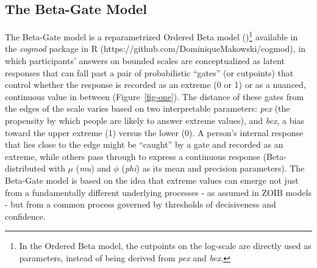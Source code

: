 \documentclass[
  jou,
  floatsintext,
  longtable,
  nolmodern,
  notxfonts,
  notimes,
  colorlinks=true,linkcolor=blue,citecolor=blue,urlcolor=blue]{apa7}
\begin{document}
\subsection{The Beta-Gate Model}\label{the-beta-gate-model}

The Beta-Gate model is a reparametrized Ordered Beta model
()\footnote{In the
  Ordered Beta model, the cutpoints on the log-scale are directly used
  as parameters, instead of being derived from \emph{pex} and
  \emph{bex}.} available in the \emph{cogmod} package in R
(https://github.com/DominiqueMakowski/cogmod), in which participants'
answers on bounded scales are conceptualized as latent responses that
can fall past a pair of probabilistic ``gates'' (or cutpoints) that
control whether the response is recorded as an extreme (0 or 1) or as a
nuanced, continuous value in between (Figure~\ref{fig-one}). The
distance of these gates from the edges of the scale varies based on two
interpretable parameters: \emph{pex} (the propensity by which people are
likely to answer extreme values), and \emph{bex}, a bias toward the
upper extreme (1) versus the lower (0). A person's internal response
that lies close to the edge might be ``caught'' by a gate and recorded
as an extreme, while others pass through to express a continuous
response (Beta-distributed with \(\mu\) (\emph{mu}) and \(\phi\)
(\emph{phi}) as its mean and precision parameters). The Beta-Gate model
is based on the idea that extreme values can emerge not just from a
fundamentally different underlying processes - as assumed in ZOIB models
- but from a common process governed by thresholds of decisiveness and
confidence.
\end{document}
